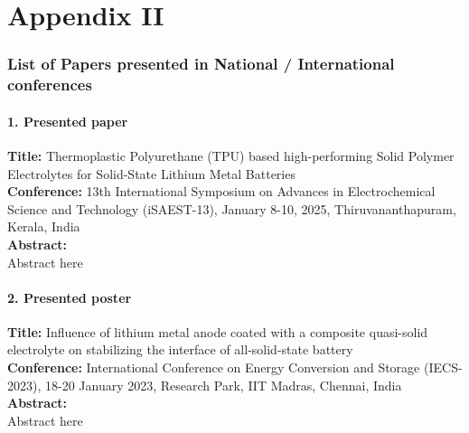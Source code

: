 \chapter*{Appendix II}

\subsection*{List of Papers presented in National / International conferences}
\vspace{1cm}
\subsubsection{1. Presented paper}
\textbf{Title:} Thermoplastic Polyurethane (TPU) based high-performing Solid Polymer Electrolytes for Solid-State Lithium Metal Batteries \\
\textbf{Conference:} 13th International Symposium on Advances in Electrochemical Science and Technology (iSAEST-13), January 8-10, 2025, Thiruvananthapuram, Kerala, India\\
\textbf{Abstract:}\\
Abstract here

\vspace{1cm}
\subsubsection{2. Presented poster}
\textbf{Title:} Influence of lithium metal anode coated with a composite quasi-solid electrolyte on stabilizing the interface of all-solid-state battery \\
\textbf{Conference:} International Conference on Energy Conversion and Storage (IECS-2023), 18-20 January 2023, Research Park, IIT Madras, Chennai, India\\
\textbf{Abstract:}\\
Abstract here
